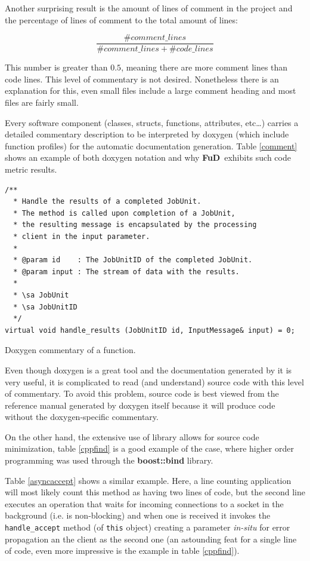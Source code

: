\documentclass[a4paper,12pt,english]{report}
\newcommand{\fud}{\textbf{FuD}}
\begin{document}
Another surprising result is the amount of lines of comment in the project and the percentage of lines of comment to the total amount of lines:

$$\frac{\#comment\_lines}{\#comment\_lines + \#code\_lines}$$

This number is greater than $0.5$, meaning there are more comment lines than code lines. This level of commentary is not desired. Nonetheless there is an explanation for this, even small files include a large comment heading and most files are fairly small. 

Every software component (classes, structs, functions, attributes, etc\ldots) carries a detailed commentary description to be interpreted by doxygen (which include function profiles) for the automatic documentation generation. Table \ref{comment} shows an example of both doxygen notation and why \fud \ exhibits such code metric results.

\begin{table}[!htb]
\lstset{language=C++}
\begin{lstlisting}[frame=single]
/**
  * Handle the results of a completed JobUnit.
  * The method is called upon completion of a JobUnit, 
  * the resulting message is encapsulated by the processing 
  * client in the input parameter.
  *
  * @param id    : The JobUnitID of the completed JobUnit.
  * @param input : The stream of data with the results.
  *
  * \sa JobUnit
  * \sa JobUnitID
  */
virtual void handle_results (JobUnitID id, InputMessage& input) = 0;
\end{lstlisting}
\centering \caption{Doxygen commentary of a function.} \label{comment}
\end{table}

Even though doxygen is a great tool and the documentation generated by it is very useful, it is complicated to read (and understand) source code with this level of commentary. To avoid this problem, source code is best viewed from the reference manual generated by doxygen itself because it will produce code without the doxygen-specific commentary.

On the other hand, the extensive use of library allows for source code minimization, table \ref{cppfind} is a good example of the case, where higher order programming was used through the \textbf{boost::bind} library.

Table \ref{asyncaccept} shows a similar example. Here, a line counting application will most likely count this method as having two lines of code, but the second line executes an operation that waits for incoming connections to a socket in the background (i.e. is non-blocking) and when one is received it invokes the \texttt{handle\_accept} method (of \texttt{this} object) creating a parameter \emph{in-situ} for error propagation an the client as the second one (an astounding feat for a single line of code, even more impressive is the example in table \ref{cppfind}).
\end{document}
